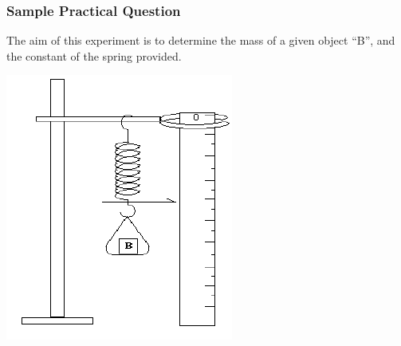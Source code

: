 \subsubsection{Sample Practical Question}

The aim of this experiment is to determine the mass of a given object ``B'', and the constant of the spring provided.

\begin{center}
\includegraphics{./img/spring-practical.png}
\end{center}


